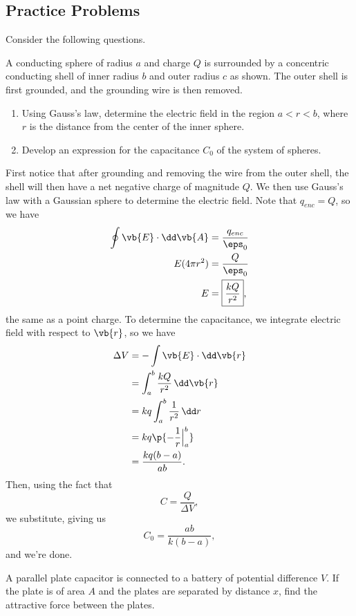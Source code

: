 \documentclass[11pt]{article}
\begin{document}
\subsection{Practice Problems}
Consider the following questions.
\begin{example}[1981 AP E1]
    A conducting sphere of radius $a$ and charge $Q$ is surrounded by a concentric conducting shell of inner radius $b$ and outer radius $c$ as shown. The outer shell is first grounded, and the grounding wire is then removed.
    \begin{enumerate}[label=(\alph*)]
        \item Using Gauss's law, determine the electric field in the region $a < r < b$, where $r$ is the distance from the center of the inner sphere.
        \item Develop an expression for the capacitance $C_0$ of the system of spheres.
    \end{enumerate}
\end{example}
\begin{solution}
    First notice that after grounding and removing the wire from the outer shell, the shell will then have a net negative charge of magnitude $Q$. We then use Gauss's law with a Gaussian sphere to determine the electric field. Note that $q_{enc} = Q$, so we have
    \begin{align*}
        \oint \vb{E}\cdot\dd\vb{A} &= \frac{q_{enc}}{\eps_0} \\
        E(4\pi r^2) &= \frac{Q}{\eps_0} \\
        E &= \boxed{\frac{kQ}{r^2}},
    \end{align*}
    the same as a point charge. To determine the capacitance, we integrate electric field with respect to $\vb{r}$, so we have
    \begin{align*}
        \Delta V &= -\int \vb{E}\cdot \dd\vb{r} \\
        &= \int_a^b \frac{kQ}{r^2}\,\dd\vb{r} \\
        &= kq\int_a^b \frac{1}{r^2}\,\dd r \\
        &= kq\p{-\frac{1}{r}\Big|_a^b} \\
        &= \frac{kq(b-a)}{ab}.
    \end{align*}
    Then, using the fact that
    \[C = \frac{Q}{\Delta V},\]
    we substitute, giving us
    \[C_0 = \boxed{\frac{ab}{k(b-a)}},\]
    and we're done.
\end{solution}
\begin{example}
    A parallel plate capacitor is connected to a battery of potential difference $V$. If the plate is of area $A$ and the plates are separated by distance $x$, find the attractive force between the plates.    
\end{example}
\end{document}
